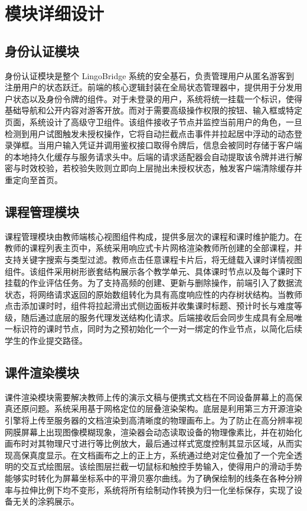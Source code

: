 \chapter{模块详细设计}

\section{身份认证模块}
身份认证模块是整个 LingoBridge 系统的安全基石，负责管理用户从匿名游客到注册用户的状态跃迁。前端的核心逻辑封装在全局状态管理器中，提供用于分发用户状态以及身份令牌的组件。对于未登录的用户，系统将统一挂载一个标识，使得基础导航和公开内容对游客开放。而对于需要高级操作权限的按钮、输入框或特定页面，系统设计了高级守卫组件。该组件接收子节点并监控当前用户的角色，一旦检测到用户试图触发未授权操作，它将自动拦截点击事件并拉起居中浮动的动态登录弹框。当用户输入凭证并调用鉴权接口取得令牌后，信息会被同时存储于客户端的本地持久化缓存与服务请求头中。后端的请求适配器会自动提取该令牌并进行解密与时效校验，若校验失败则立即向上层抛出未授权状态，触发客户端清除缓存并重定向至首页。

\section{课程管理模块}
课程管理模块由教师端核心视图组件构成，提供多层次的课程和课时维护能力。在教师的课程列表主页中，系统采用响应式卡片网格渲染教师所创建的全部课程，并支持关键字搜索与类型过滤。教师点击任意课程卡片后，将无缝载入课时详情视图组件。该组件采用树形嵌套结构展示各个教学单元、具体课时节点以及每个课时下挂载的作业评估任务。为了支持高频的创建、更新与删除操作，前端引入了数据流状态，将网络请求返回的原始数组转化为具有高度响应性的内存树状结构。当教师点击添加课时时，组件将拉起滑出式侧边面板并收集课时标题、预计时长与难度等级，随后通过底层的服务代理发送结构化请求。后端接收后会同步生成具有全局唯一标识符的课时节点，同时为之预初始化一个一对一绑定的作业节点，以简化后续学生的作业提交路径。

\section{课件渲染模块}
课件渲染模块需要解决教师上传的演示文稿与便携式文档在不同设备屏幕上的高保真还原问题。系统采用基于网格定位的层叠渲染架构。底层是利用第三方开源渲染引擎将上传至服务器的文档渲染到高清晰度的物理画布上。为了防止在高分辨率视网膜屏幕上出现图像模糊现象，渲染器会动态读取设备的物理像素比，并在初始化画布时对其物理尺寸进行等比例放大，最后通过样式宽度控制其显示区域，从而实现高保真度显示。在文档画布之上的正上方，系统通过绝对定位叠加了一个完全透明的交互式绘图层。该绘图层拦截一切鼠标和触控手势输入，使得用户的滑动手势能够实时转化为屏幕坐标系中的平滑贝塞尔曲线。为了确保绘制的线条在各种分辨率与拉伸比例下均不变形，系统将所有绘制动作转换为归一化坐标保存，实现了设备无关的涂鸦展示。

